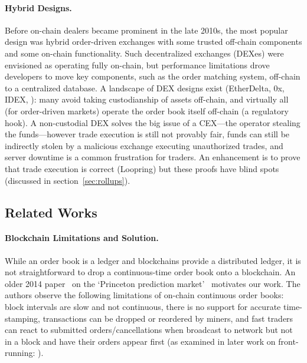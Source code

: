 \paragraph{Hybrid Designs.} Before on-chain dealers became prominent in the late 2010s, the most popular design was hybrid order-driven exchanges with some trusted off-chain components and some on-chain functionality. Such decentralized exchanges (DEXes) were envisioned as operating fully on-chain, but performance limitations drove developers to move key components, such as the order matching system, off-chain to a centralized database. A landscape of DEX designs exist (\eg EtherDelta, 0x, IDEX, \etc): many avoid taking custodianship of assets off-chain, and virtually all (for order-driven markets) operate the order book itself off-chain (a regulatory hook). A non-custodial DEX solves the big issue of a CEX---the operator stealing the funds---however trade execution is still not provably fair, funds can still be indirectly stolen by a malicious exchange executing unauthorized trades, and server downtime is a common frustration for traders. An enhancement is to prove that trade execution is correct (\eg Loopring) but these proofs have blind spots (discussed in section~\ref{sec:rollups}). 

\subsection{Related Works}

\paragraph{Blockchain Limitations and Solution.} While an order book is a ledger and blockchains provide a distributed ledger, it is not straightforward to drop a continuous-time order book onto a blockchain. An older 2014 paper~\cite{clark2014decentralizing} on the `Princeton prediction market'~\cite{Bra13} motivates our work. The authors observe the following limitations of on-chain continuous order books: block intervals are slow and not continuous, there is no support for accurate time-stamping, transactions can be dropped or reordered by miners, and fast traders can react to submitted orders/cancellations when broadcast to network but not in a block and have their orders appear first (as examined in later work on front-running: \cite{eskandari2019sok,daian2019flash}).

